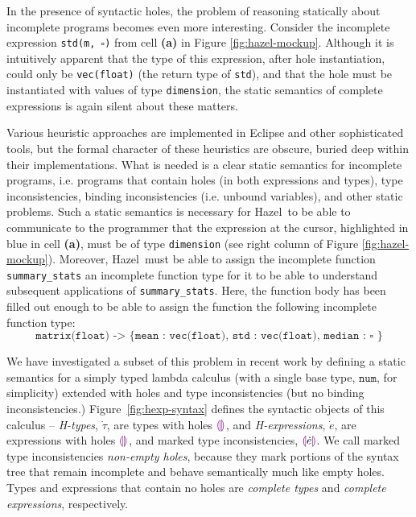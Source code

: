 \documentclass[letterpaper,USenglish]{lipics-v2016}
\newcommand{\llparenthesiscolor}{\textcolor{violet}{\llparenthesis}}
\newcommand{\rrparenthesiscolor}{\textcolor{violet}{\rrparenthesis}}
\newcommand{\htau}{\dot{\tau}}
\newcommand{\tnum}{\texttt{num}}
\newcommand{\tehole}{\llparenthesiscolor\rrparenthesiscolor}
\newcommand{\hexp}{\dot{e}}
\newcommand{\hehole}{\llparenthesiscolor\rrparenthesiscolor}
\newcommand{\hhole}[1]{\llparenthesiscolor#1\rrparenthesiscolor}
\let\li\lstinline
\newcommand{\Hazel}[0]{\textsf{Hazel}}
\newcommand{\HazelEnv}[0]{\Hazel}
\begin{document}
In the presence of syntactic holes, the problem of reasoning statically about incomplete programs 
becomes even more interesting.  Consider the incomplete expression \texttt{std(m,~$\square$)} 
from cell \textbf{(a)} in Figure \ref{fig:hazel-mockup}.
%
%
Although it is intuitively apparent that the type of this expression, after hole instantiation, could only be \lstinline{vec(float)} (the return type of \lstinline{std}),
and that the hole must be instantiated with values of type \li{dimension}, the static
semantics of complete expressions is again silent about these matters. 

Various heuristic
approaches are implemented in Eclipse and other sophisticated tools, but the 
formal character of these heuristics are obscure, buried deep within their implementations. What is needed is a clear static semantics for incomplete programs, i.e. programs that contain holes (in both expressions and types), type inconsistencies, binding inconsistencies (i.e. unbound variables), and
other static problems. Such a static semantics is necessary for \HazelEnv~to be able to  
communicate to the programmer that the expression at the cursor, highlighted in blue in cell \textbf{(a)}, must be of type \li{dimension} (see right column of Figure \ref{fig:hazel-mockup}). Moreover, \HazelEnv~must be able to assign the incomplete function
\li{summary_stats} an incomplete function
type for it to be able to understand subsequent applications of \li{summary_stats}. Here, the function body has been filled out enough to be able to assign the function the following incomplete function type:
\[\texttt{matrix(float) -> \{ {mean} : vec(float), std : vec(float), median :~$\square$ \}}\] %

We have investigated a subset of this problem in recent work \cite{popl-paper} by defining a static
semantics for a simply typed lambda calculus (with a 
single base type, $\tnum$, for simplicity) extended with holes and type
inconsistencies (but no binding inconsistencies.) Figure~\ref{fig:hexp-syntax} defines the syntactic
objects of this calculus -- \emph{H-types}, $\htau$,
are types with holes $\tehole$, and \emph{H-expressions}, $\hexp$, are
expressions with holes $\hehole$, and marked type inconsistencies,
$\hhole{\hexp}$. We call marked type inconsistencies \emph{non-empty holes},
because they mark portions of the syntax tree that remain
incomplete and behave semantically much like empty holes. Types and expressions that contain no holes are \emph{complete
  types} and \emph{complete expressions}, respectively.
\end{document}

